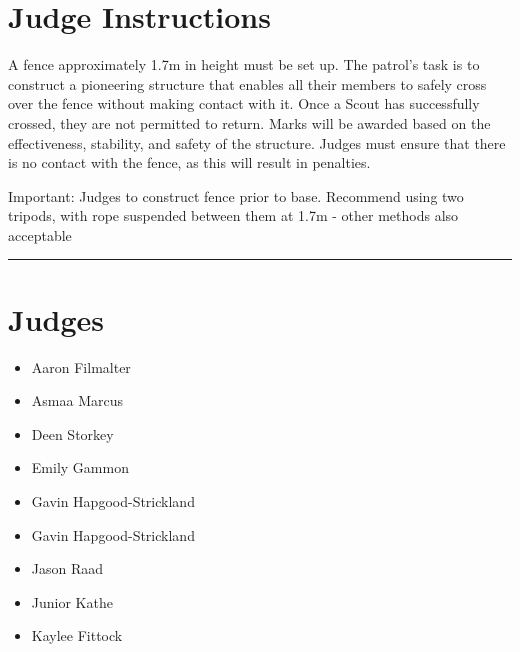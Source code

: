 \documentclass[10pt]{article}
\begin{document}
		\section*{Judge Instructions}
		A fence approximately 1.7m in height must be set up. The patrol's task is to construct a pioneering structure that enables all their members to safely cross over the fence without making contact with it. Once a Scout has successfully crossed, they are not permitted to return. Marks will be awarded based on the effectiveness, stability, and safety of the structure. Judges must ensure that there is no contact with the fence, as this will result in penalties.



Important: Judges to construct fence prior to base. Recommend using two tripods, with rope suspended between them at 1.7m - other methods also acceptable


\vspace{0.5cm}
	\hrule
	\vspace{0.5cm}
		\section*{\faUsers \: Judges}

		

	\begin{multicols}{2}

		\begin{itemize}
									\item Aaron Filmalter
									\item Asmaa Marcus
									\item Deen Storkey
									\item Emily Gammon
									\item Gavin Hapgood-Strickland
						\end{itemize}

		\vfill\null
		\columnbreak

		\begin{itemize}
									\item Gavin Hapgood-Strickland
									\item Jason Raad
									\item Junior Kathe
									\item Kaylee Fittock
						\end{itemize}

		\vfill\null

		\end{multicols}
\end{document}
